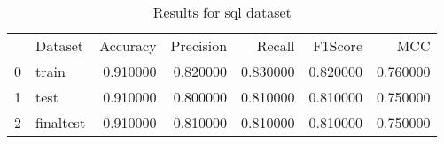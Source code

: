 \begin{table}
\caption{Results for sql dataset}
\begin{tabular}{llrrrrr}
 & Dataset & Accuracy & Precision & Recall & F1Score & MCC \\
0 & train & 0.910000 & 0.820000 & 0.830000 & 0.820000 & 0.760000 \\
1 & test & 0.910000 & 0.800000 & 0.810000 & 0.810000 & 0.750000 \\
2 & finaltest & 0.910000 & 0.810000 & 0.810000 & 0.810000 & 0.750000 \\
\end{tabular}
\end{table}
